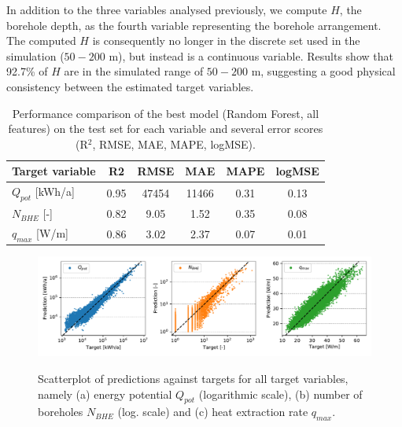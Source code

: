 In addition to the three variables analysed previously, we compute $H$, the borehole depth, as the fourth variable representing the borehole arrangement. The computed $H$ is consequently no longer in the discrete set used in the simulation ($50-200$ m), but instead is a continuous variable. Results show that 92.7\% of $H$ are in the simulated range of $50-200$ m, suggesting a good physical consistency between the estimated target variables.

\begin{table}[tb]
\footnotesize
\centering
\caption{Performance comparison of the best model (Random Forest, all features) on the test set for each variable and several error scores (R$^2$, RMSE, MAE, MAPE, logMSE).}
\label{tab:geo_ML_regr}
\begin{tabular}{lccccc}
\hline
\textbf{Target   variable} & \textbf{R2} & \textbf{RMSE} & \textbf{MAE} & \textbf{MAPE} & \textbf{logMSE} \\ \hline
$Q_{pot}$ {[}kWh/a{]} & 0.95 & 47454 & 11466 & 0.31 & 0.13 \\
$N_{BHE}$ {[}-{]} & 0.82 & 9.05 & 1.52 & 0.35 & 0.08 \\
$q_{max}$ {[}W/m{]} & 0.86 & 3.02 & 2.37 & 0.07 & 0.01 \\ \hline
\end{tabular}
\end{table}

\begin{figure}[tb]
\centering
\includegraphics[width=\linewidth]{images/Figs/scatterplot_best_prediction.pdf}
\begin{subfigure}{.33\textwidth}
  \subcaption{}
\end{subfigure}
\begin{subfigure}{.33\textwidth}
  \subcaption{}
\end{subfigure}
\begin{subfigure}{.32\textwidth}
  \subcaption{}
\end{subfigure}
\caption{Scatterplot of predictions against targets for all target variables, namely (a) energy potential $Q_{pot}$ (logarithmic scale), (b) number of boreholes $N_{BHE}$ (log. scale) and (c) heat extraction rate $q_{max}$.}
\label{fig:geo_ML_regr}
\end{figure}

